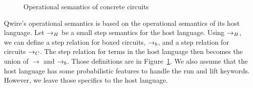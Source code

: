 \begin{figure}[t]
\caption{Operational semantics of concrete circuits}
\label{fig:qwire_op}
\end{figure}

Qwire's operational semantics is based on the operational semantics of its host language.
Let $\rightarrow_{H}$ be a small step semantics for the host language.
Using $\rightarrow_{H}$, we can define a step relation for boxed circuits, $\rightarrow_{b}$, and a step relation for circuits $\rightarrow_{C}$.
The step relation for terms in the host language then becomes the union of $\rightarrow$ and $\rightarrow_{b}$.
Those definitions are in Figure~\ref{fig:qwire_op}.
We also assume that the host language has some probabilistic features to handle the run and lift keywords.
However, we leave those specifics to the host language.

